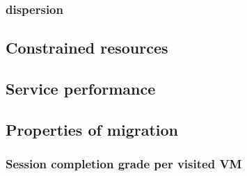 \subsubsection{\Dc dispersion}

\subsection{Constrained \dc resources}

\subsection{Service performance}

\subsection{Properties of migration}
\subsubsection{Session completion grade per visited VM}